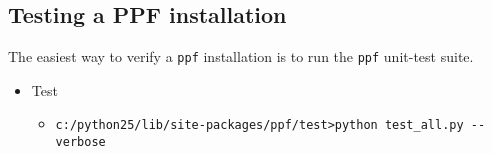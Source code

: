 \subsection{Testing a PPF installation}

The easiest way to verify a \verb|ppf| installation is to run the
\verb|ppf| unit-test suite.

\begin{itemize}
  \item{Test}
  \begin{itemize}
  \item{\verb|c:/python25/lib/site-packages/ppf/test>python test_all.py --verbose|}
  \end{itemize}
\end{itemize}
